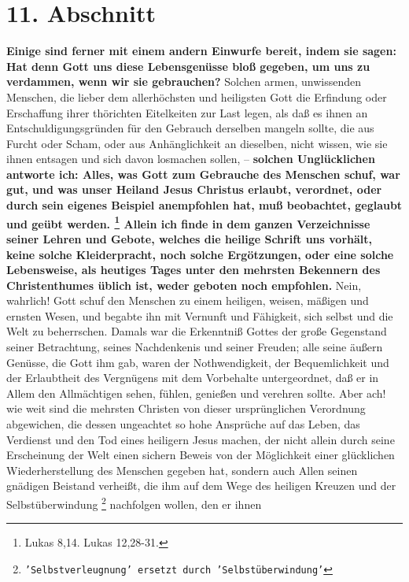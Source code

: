 {\section{11. Abschnitt} \label{kap17_ab11}

\textbf{Einige sind ferner mit einem andern Einwurfe bereit, indem sie sagen:
Hat denn
Gott uns diese Lebensgenüsse bloß gegeben, um uns zu verdammen, wenn wir sie
gebrauchen?} Solchen armen, unwissenden Menschen, die lieber dem allerhöchsten
und heiligsten Gott die Erfindung oder Erschaffung ihrer thörichten Eitelkeiten
zur Last legen, als daß es ihnen an Entschuldigungsgründen für den Gebrauch
derselben mangeln sollte, die aus Furcht oder Scham, oder aus Anhänglichkeit an
dieselben, nicht wissen, wie sie ihnen entsagen und sich davon losmachen sollen,
-- \textbf{solchen Unglücklichen antworte ich: Alles, was Gott zum Gebrauche des
Menschen schuf, war gut, und was unser Heiland Jesus Christus erlaubt,
verordnet, oder durch sein eigenes Beispiel anempfohlen hat, muß beobachtet,
geglaubt und geübt werden. 
\footnote{Lukas  8,14. Lukas 12,28-31.}
Allein ich
finde in dem ganzen Verzeichnisse seiner Lehren und Gebote, welches die heilige
Schrift uns vorhält, keine solche Kleiderpracht, noch solche Ergötzungen, oder
eine solche Lebensweise, als heutiges Tages unter den mehrsten Bekennern des
Christenthumes üblich ist, weder geboten noch empfohlen.} Nein, wahrlich! Gott
schuf den Menschen zu einem heiligen, weisen, mäßigen und ernsten Wesen, und
begabte ihn mit Vernunft und Fähigkeit, sich selbst und die Welt zu beherrschen.
Damals war die Erkenntniß Gottes der große Gegenstand seiner Betrachtung, seines
Nachdenkenis und seiner Freuden; alle seine äußern Genüsse, die Gott ihm gab,
waren der Nothwendigkeit, der Bequemlichkeit und der Erlaubtheit des Vergnügens
mit dem Vorbehalte untergeordnet, daß er in Allem den Allmächtigen sehen,
fühlen, genießen und verehren sollte. Aber ach! wie weit sind die mehrsten
Christen von dieser ursprünglichen Verordnung abgewichen, die dessen ungeachtet
so hohe Ansprüche auf das Leben, das Verdienst und den Tod eines heiligern Jesus
machen, der nicht allein durch seine Erscheinung der Welt einen sichern Beweis
von der Möglichkeit einer glücklichen Wiederherstellung des Menschen gegeben
hat, sondern auch Allen seinen gnädigen Beistand verheißt, die ihm auf dem Wege
des heiligen Kreuzen und der Selbstüberwindung
\footnote{\texttt{'Selbstverleugnung' ersetzt durch 'Selbstüberwindung'}}
nachfolgen wollen, den er ihnen
}
